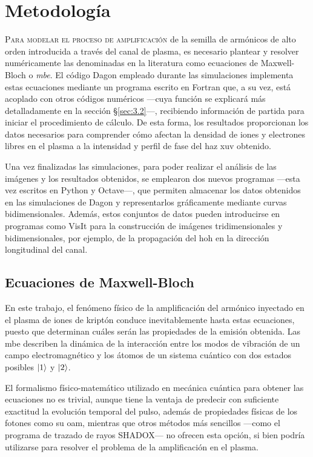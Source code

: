 \chapter{Metodología}\label{cap:3}
\lettrine{P}{ara modelar el proceso de amplificación} de la semilla de armónicos de alto orden introducida a través del canal de plasma, es necesario plantear y resolver numéricamente las denominadas en la literatura como ecuaciones de Maxwell-Bloch o \emph{\acrfull{mbe}}. El código Dagon empleado durante las simulaciones implementa estas ecuaciones mediante un programa escrito en Fortran que, a su vez, está acoplado con otros códigos numéricos ---cuya función se explicará más detalladamente en la sección \S\ref{sec:3.2}---, recibiendo información de partida para iniciar el procedimiento de cálculo. De esta forma, los resultados proporcionan los datos necesarios para comprender cómo afectan la densidad de iones y electrones libres en el plasma a la intensidad y perfil de fase del haz \acrshort{xuv} obtenido. 

Una vez finalizadas las simulaciones, para poder realizar el análisis de las imágenes y los resultados obtenidos, se emplearon dos nuevos programas ---esta vez escritos en Python y Octave---, que permiten almacenar los datos obtenidos en las simulaciones de Dagon y representarlos gráficamente mediante curvas bidimensionales. Además, estos conjuntos de datos pueden introducirse en programas como VisIt para la construcción de imágenes tridimensionales y bidimensionales, por ejemplo, de la propagación del \acrshort{hoh} en la dirección longitudinal del canal.

\section{Ecuaciones de Maxwell-Bloch}\label{sec:3.1}
En este trabajo, el fenómeno físico de la amplificación del armónico inyectado en el plasma de iones de kriptón conduce inevitablemente hasta estas ecuaciones, puesto que determinan cuáles serán las propiedades de la emisión obtenida. Las \acrshort{mbe} describen la dinámica de la interacción entre los modos de vibración de un campo electromagnético y los átomos de un sistema cuántico con dos estados posibles $\left|1\right\rangle$ y $\left|2\right\rangle$. 

El formalismo físico-matemático utilizado en mecánica cuántica para obtener las ecuaciones no es trivial\autocite{Cohen-Tannoudji2019a,Sakurai2020,Milonni1988}, aunque tiene la ventaja de predecir con suficiente exactitud la evolución temporal del pulso, además de propiedades físicas de los fotones como su \acrshort{oam}, mientras que otros métodos más sencillos ---como el programa de trazado de rayos SHADOX--- no ofrecen esta opción, si bien podría utilizarse para resolver el problema de la amplificación en el plasma. 

